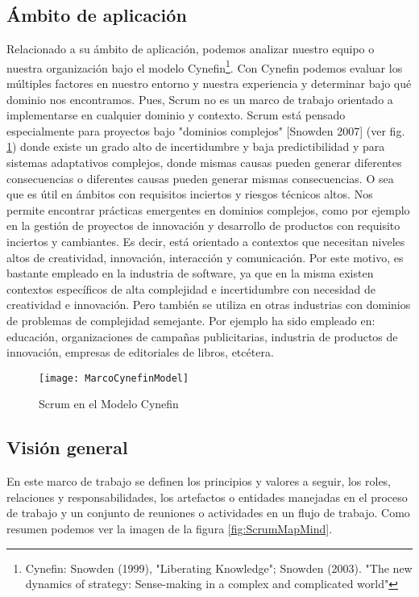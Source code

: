 \subsection{Ámbito de aplicación}

Relacionado a su ámbito de aplicación, podemos analizar nuestro equipo o nuestra organización bajo el modelo Cynefin\footnote{Cynefin: Snowden (1999), "Liberating Knowledge"; Snowden (2003). "The new dynamics of strategy: Sense-making in a complex and complicated world"}. Con Cynefin podemos evaluar los múltiples factores en nuestro entorno y nuestra experiencia y determinar bajo qué dominio nos encontramos. Pues, Scrum no es un marco de trabajo orientado a implementarse en cualquier dominio y contexto. Scrum está pensado especialmente para proyectos bajo "dominios complejos" [Snowden 2007] (ver fig. \ref{fig:MarcoCynefinModel}) donde existe un grado alto de incertidumbre y baja predictibilidad y para sistemas adaptativos complejos, donde mismas causas pueden generar diferentes consecuencias o diferentes causas pueden generar mismas consecuencias. O sea que es útil en ámbitos con requisitos inciertos y riesgos técnicos altos. Nos permite encontrar prácticas emergentes en dominios complejos, como por ejemplo en la gestión de proyectos de innovación \cite{Martin-Alaimo-2014} y desarrollo de productos con requisito inciertos y cambiantes. Es decir, está orientado a contextos que necesitan niveles altos de creatividad, innovación, interacción y comunicación. Por este motivo, es bastante empleado en la industria de software, ya que en la misma existen contextos específicos de alta complejidad e incertidumbre con necesidad de creatividad e innovación. Pero también se utiliza en otras industrias con dominios de problemas de complejidad semejante. Por ejemplo ha sido empleado en: educación, organizaciones de campañas publicitarias, industria de productos de innovación, empresas de editoriales de libros, etcétera.

\begin{figure}[h]
  \centering
  \texttt{[image: MarcoCynefinModel]}
  \caption{Scrum en el Modelo Cynefin}
  \centering
  \label{fig:MarcoCynefinModel} %
\end{figure}

\subsection{Visión general}

En este marco de trabajo se definen los principios y valores a seguir, los roles, relaciones y responsabilidades, los artefactos o entidades manejadas en el proceso de trabajo y un conjunto de reuniones o actividades en un flujo de trabajo. Como resumen podemos ver la imagen de la figura \ref{fig:ScrumMapMind}.


